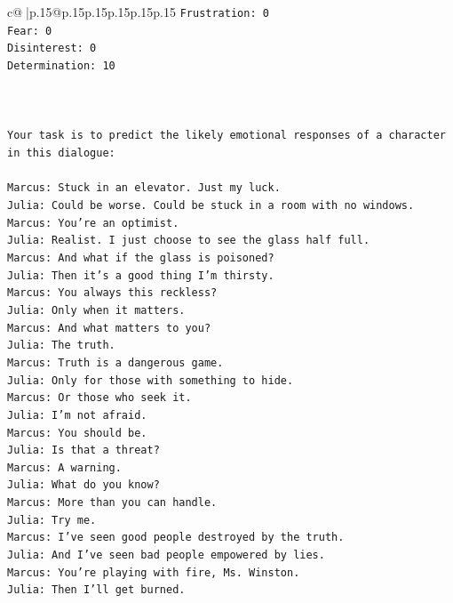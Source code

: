 \documentclass{article}
\begin{document}
{\begin{supertabular}{c@{$\;$}|p{.15\linewidth}@{}p{.15\linewidth}p{.15\linewidth}p{.15\linewidth}p{.15\linewidth}p{.15\linewidth}}
{{{\texttt{Frustration: 0} \\
\texttt{Fear: 0} \\
\texttt{Disinterest: 0} \\
\texttt{Determination: 10} \\
\\ 
\\ 
\\ 
\texttt{Your task is to predict the likely emotional responses of a character in this dialogue:} \\
\\ 
\texttt{Marcus: Stuck in an elevator. Just my luck.} \\
\texttt{Julia: Could be worse. Could be stuck in a room with no windows.} \\
\texttt{Marcus: You're an optimist.} \\
\texttt{Julia: Realist. I just choose to see the glass half full.} \\
\texttt{Marcus: And what if the glass is poisoned?} \\
\texttt{Julia: Then it's a good thing I'm thirsty.} \\
\texttt{Marcus: You always this reckless?} \\
\texttt{Julia: Only when it matters.} \\
\texttt{Marcus: And what matters to you?} \\
\texttt{Julia: The truth.} \\
\texttt{Marcus: Truth is a dangerous game.} \\
\texttt{Julia: Only for those with something to hide.} \\
\texttt{Marcus: Or those who seek it.} \\
\texttt{Julia: I'm not afraid.} \\
\texttt{Marcus: You should be.} \\
\texttt{Julia: Is that a threat?} \\
\texttt{Marcus: A warning.} \\
\texttt{Julia: What do you know?} \\
\texttt{Marcus: More than you can handle.} \\
\texttt{Julia: Try me.} \\
\texttt{Marcus: I've seen good people destroyed by the truth.} \\
\texttt{Julia: And I've seen bad people empowered by lies.} \\
\texttt{Marcus: You're playing with fire, Ms. Winston.} \\
\texttt{Julia: Then I'll get burned.} \\
}}}
\end{supertabular}}
\end{document}
